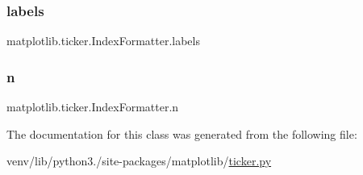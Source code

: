 \subsubsection{\texorpdfstring{labels}{labels}}
{\footnotesize\ttfamily matplotlib.\+ticker.\+Index\+Formatter.\+labels}

\mbox{\label{classmatplotlib_1_1ticker_1_1IndexFormatter_a04f368544c7d76a10aa026a3311681e8}} 
\subsubsection{\texorpdfstring{n}{n}}
{\footnotesize\ttfamily matplotlib.\+ticker.\+Index\+Formatter.\+n}



The documentation for this class was generated from the following file\+:\begin{DoxyCompactItemize}
\item 
venv/lib/python3./site-\/packages/matplotlib/\hyperlink{ticker_8py}{ticker.\+py}\end{DoxyCompactItemize}
